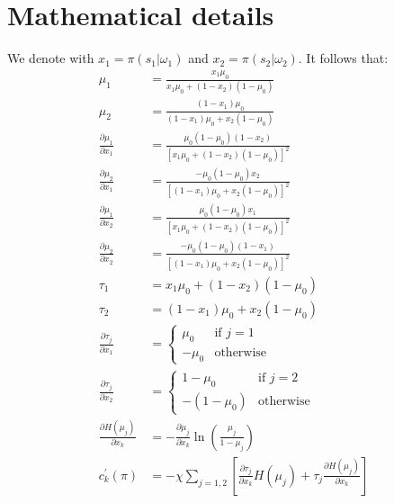 \documentclass[12pt,a4paper]{article}
\begin{document}
\section{Mathematical details}
\label{math}
We denote with $x_1=\pi(s_1|\omega_1)$ and $x_2=\pi(s_2|\omega_2)$. It follows that:
\begin{align}
    \mu_1 & = \frac{x_1\mu_0}{x_1\mu_0 + (1-x_2)(1-\mu_0)} \\
    \mu_2 & = \frac{(1-x_1)\mu_0}{(1-x_1)\mu_0 + x_2(1-\mu_0)}\\
    \frac{\partial \mu_1}{\partial x_1} & =\frac{\mu_0(1-\mu_0)(1-x_2)}{[x_1\mu_0+(1-x_2)(1-\mu_0)]^2}\\
    \frac{\partial \mu_2}{\partial x_1} & =\frac{-\mu_0(1-\mu_0)x_2}{[(1-x_1)\mu_0+x_2(1-\mu_0)]^2}\\
    \frac{\partial \mu_1}{\partial x_2} & =\frac{\mu_0(1-\mu_0)x_1}{[x_1\mu_0+(1-x_2)(1-\mu_0)]^2}\\
    \frac{\partial \mu_2}{\partial x_2} & =\frac{-\mu_0(1-\mu_0)(1-x_1)}{[(1-x_1)\mu_0+x_2(1-\mu_0)]^2} \\
    \tau_1 & =x_1\mu_0 + (1-x_2)(1-\mu_0) \\
    \tau_2 & =(1-x_1)\mu_0 + x_2(1-\mu_0) \\
    \frac{\partial \tau_{j}}{\partial x_1} & = \left\{\begin{array}{ll}
        \mu_0 & \mbox{if } j = 1\\
        -\mu_0 & \mbox{otherwise}
        \end{array}\right. \\
        \frac{\partial \tau_{j}}{\partial x_2} & = \left\{\begin{array}{ll}
        1-\mu_0 & \mbox{if } j = 2\\
        -(1-\mu_0) & \mbox{otherwise}
        \end{array}\right. \\
    \frac{\partial H(\mu_{j})}{\partial x_k} & = -\frac{\partial \mu_j}{\partial x_k}\ln\left(\frac{\mu_j}{1-\mu_j}\right) \\
    c_k^\prime(\pi) & = -\chi \sum_{j=1,2} \left[\frac{\partial \tau_{j}}{\partial x_k}H(\mu_j) + \tau_{j}\frac{\partial H(\mu_j)}{\partial x_k}\right]
\end{align}
\end{document}
